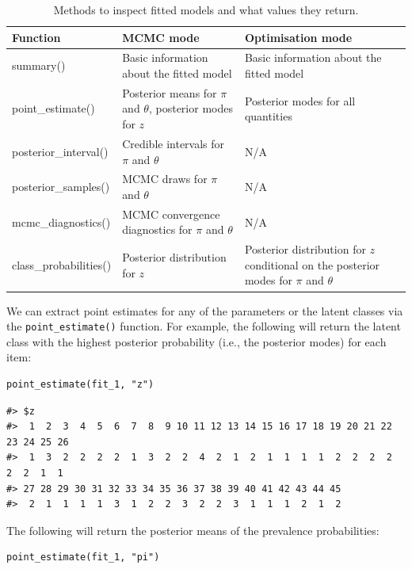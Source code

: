\begin{table}

\caption{\label{tab:inspecting-fitted-models}Methods to inspect fitted models and what values they return.}
\centering
\begin{tabular}[t]{lll}
\toprule
Function & MCMC mode & Optimisation mode\\
\midrule
summary() & Basic information about the fitted model & Basic information about the fitted model\\
point\_estimate() & Posterior means for $\pi$ and $\theta$, posterior modes for $z$ & Posterior modes for all quantities\\
posterior\_interval() & Credible intervals for $\pi$ and $\theta$ & N/A\\
posterior\_samples() & MCMC draws for $\pi$ and $\theta$ & N/A\\
mcmc\_diagnostics() & MCMC convergence diagnostics for $\pi$ and $\theta$ & N/A\\
class\_probabilities() & Posterior distribution for $z$ & Posterior distribution for $z$ conditional on the
                          posterior modes for $\pi$ and $\theta$\\
\bottomrule
\end{tabular}
\end{table}

We can extract point estimates for any of the parameters or the latent classes
via the \texttt{point\_estimate()} function. For example, the following will
return the latent class with the highest posterior probability (i.e., the
posterior modes) for each item:

\begin{verbatim}
point_estimate(fit_1, "z")
\end{verbatim}

\begin{verbatim}
#> $z
#>  1  2  3  4  5  6  7  8  9 10 11 12 13 14 15 16 17 18 19 20 21 22 23 24 25 26 
#>  1  3  2  2  2  2  1  3  2  2  4  2  1  2  1  1  1  1  2  2  2  2  2  2  1  1 
#> 27 28 29 30 31 32 33 34 35 36 37 38 39 40 41 42 43 44 45 
#>  2  1  1  1  1  3  1  2  2  3  2  2  3  1  1  1  2  1  2
\end{verbatim}

The following will return the posterior means of the prevalence probabilities:

\begin{verbatim}
point_estimate(fit_1, "pi")
\end{verbatim}

